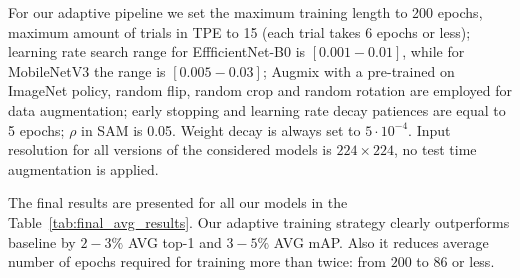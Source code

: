 \documentclass[runningheads]{llncs}
\begin{document}
\begin{table}[h]
  \caption{Results of our adaptive training pipeline against baseline.}
  \label{tab:final_avg_results}
    \centering
  \end{table}

For our adaptive pipeline we set the maximum training length to 200 epochs, maximum amount of trials in TPE
to 15 (each trial takes 6 epochs or less); learning rate search range for EffficientNet-B0 is $[0.001-0.01]$,
while for MobileNetV3 the range is $[0.005-0.03]$; Augmix with a pre-trained on ImageNet policy, random flip,
random crop and random rotation are employed for data augmentation; early stopping and learning rate decay patiences
are equal to 5 epochs; $\rho$ in SAM is 0.05. Weight decay is always set to $5\cdot10^{-4}$. Input resolution
for all versions of the considered models is $224\times224$, no test time augmentation is applied.

The final results are presented for all our models in the Table~\ref{tab:final_avg_results}. Our adaptive training
strategy clearly outperforms baseline by $2-3\%$ AVG top-1 and $3-5\%$ AVG mAP. Also it reduces
average number of epochs required for training more than twice: from $200$ to $86$ or less.
\end{document}
